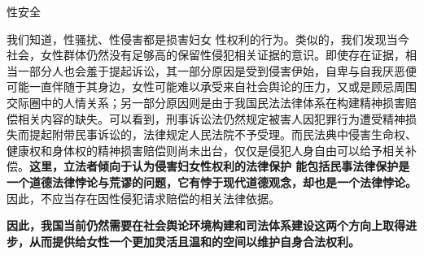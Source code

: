 \begin{frame}{性安全}
    \begin{block}{}
        我们知道，性骚扰、性侵害都是损害妇女 性权利的行为。类似的，我们发现当今社会，女性群体仍然没有足够高的保留性侵犯相关证据的意识。即使存在证据，相当一部分人也会羞于提起诉讼，其一部分原因是受到侵害伊始，自卑与自我厌恶便可能一直伴随于其身边，女性可能难以承受来自社会舆论的压力，又或是顾忌周围交际圈中的人情关系；另一部分原因则是由于我国民法法律体系在构建精神损害赔偿相关内容的缺失。可以看到，刑事诉讼法仍然规定被害人因犯罪行为遭受精神损失而提起附带民事诉讼的，法律规定人民法院不予受理。而民法典中侵害生命权、健康权和身体权的精神损害赔偿则尚未出台，仅仅是侵犯人身自由可以给予相关补偿。\textbf{这里，立法者倾向于认为侵害妇女性权利的法律保护 能包括民事法律保护是一个道德法律悖论与荒谬的问题，它有悖于现代道德观念，却也是一个法律悖论。}因此，不应当存在因性侵犯请求赔偿的相关法律依据。

        \textbf{因此，我国当前仍然需要在社会舆论环境构建和司法体系建设这两个方向上取得进步，从而提供给女性一个更加灵活且温和的空间以维护自身合法权利。}
    \end{block}
\end{frame}
